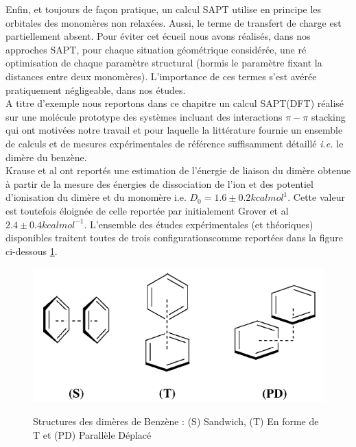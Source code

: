    					
Enfin, et toujours de façon pratique, un calcul SAPT utilise en principe les orbitales des monomères non relaxées. Aussi, le terme de transfert de charge est partiellement absent. Pour éviter cet écueil nous avons réalisés, dans nos approches SAPT, pour chaque situation géométrique considérée, une ré optimisation de chaque paramètre structural (hormis le paramètre fixant la distances entre deux monomères). L’importance de ces termes s’est avérée pratiquement négligeable, dans nos études.\\
   					
A titre d’exemple nous reportons dans ce chapitre un calcul SAPT(DFT) réalisé sur une molécule prototype des systèmes incluant des interactions $\pi-\pi$ stacking qui ont motivées notre travail et pour laquelle la littérature fournie un ensemble de calculs et de mesures expérimentales de référence suffisamment détaillé \textit{i.e.} le dimère du benzène. \\
   					
Krause et al \cite{krause1991binding} ont reportés une estimation de l’énergie de liaison du dimère obtenue à partir de la mesure  des énergies de dissociation de l'ion et des potentiel d’ionisation du dimère et du monomère i.e. $D_{0}= 1.6 \pm 0.2 kcal mol^{1}$. Cette valeur est toutefois éloignée de celle reportée par initialement Grover et al \cite{grover1987dissociation} $2.4 \pm 0.4 kcal mol^{-1}$. 
L’ensemble des études expérimentales (et théoriques) disponibles traitent toutes de trois configurationscomme reportées dans la figure ci-dessous \ref{figprot}.
   					
\begin{figure}[H]
   \centering
   \includegraphics[scale=0.8]{image/Prot} \label{figprot}
   \caption[Structures du dimère de Benzène]{Structures des dimères de Benzène : (S) Sandwich, (T) En forme de T et (PD) Parallèle Déplacé}
\end{figure}
   					
